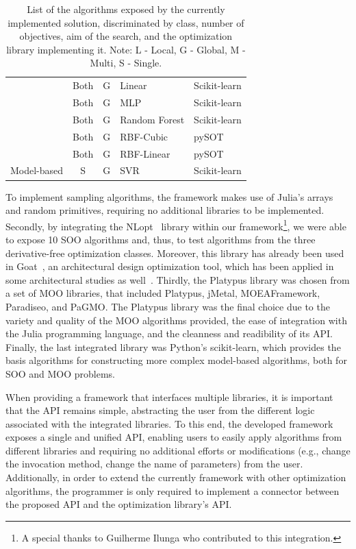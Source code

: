 \begin{table}[]
\begin{tabular}{cccll}
		& Both & G & Linear & Scikit-learn \\
		& Both & G & MLP & Scikit-learn \\
		& Both & G & Random Forest & Scikit-learn \\
		& Both & G & RBF-Cubic & pySOT \\
		& Both & G & RBF-Linear & pySOT \\
		\multirow{-10}{*}{Model-based} & S & G & SVR & Scikit-learn
	\end{tabular}
	\caption[Solution's list of supported algorithms]{List of the algorithms exposed by the currently implemented solution, discriminated by class, number of objectives, aim of the search, and the optimization library implementing it. Note: L - Local, G - Global, M - Multi, S - Single.}
	\label{table:algorithms}
\end{table}
To implement sampling algorithms, the framework makes use of Julia's arrays and random primitives, requiring no additional libraries to be implemented. Secondly, by integrating the NLopt~\cite{NLOPT} library within our framework\footnote{A special thanks to Guilherme Ilunga who contributed to this integration.}, we were able to expose 10 \ac{SOO} algorithms and, thus, to test algorithms from the three derivative-free optimization classes. Moreover, this library has already been used in Goat~\cite{GOAT}, an architectural design optimization tool, which has been applied in some architectural studies as well~\cite{Wortmann2017ADO}. Thirdly, the Platypus library was chosen from a set of \ac{MOO} libraries, that included Platypus, jMetal, MOEAFramework, Paradiseo, and PaGMO. The Platypus library was the final choice due to the variety and quality of the \ac{MOO} algorithms provided, the ease of integration with the Julia programming language, and the cleanness and readibility of its \ac{API}. Finally, the last integrated library was Python's scikit-learn, which provides the basis algorithms for constructing more complex model-based algorithms, both for \ac{SOO} and \ac{MOO} problems.

When providing a framework that interfaces multiple libraries, it is important that the \ac{API} remains simple, abstracting the user from the different logic associated with the integrated libraries. To this end, the developed framework exposes a single and unified \ac{API}, enabling users to easily apply algorithms from different libraries and requiring no additional efforts or modifications (e.g., change the invocation method, change the name of parameters) from the user. Additionally, in order to extend the currently framework with other optimization algorithms, the programmer is only required to implement a connector between the proposed \ac{API} and the optimization library's \ac{API}.


